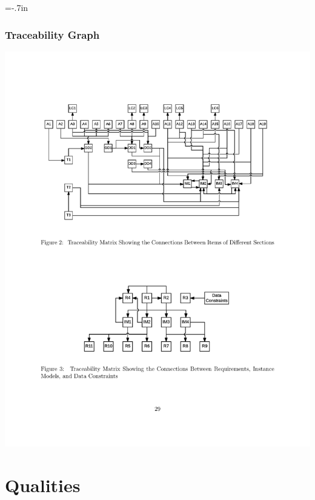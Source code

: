 \documentclass{beamer}
\begin{document}

\hoffset=-.7in %

\begin{frame}

\frametitle{Traceability Graph}

\begin{center}
\includegraphics[scale=0.75]{TraceGraph.pdf}
\end{center}

\end{frame}
\hoffset=0in


\section[Qualities]{Qualities}

\end{document}
